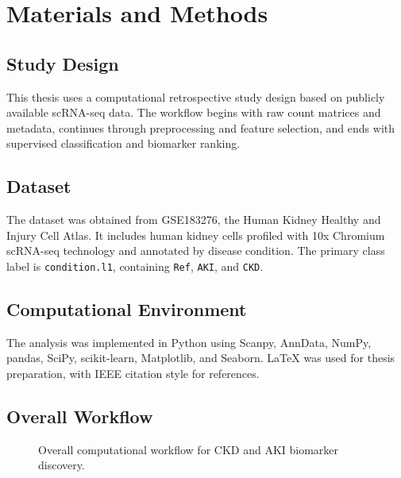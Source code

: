\chapter{Materials and Methods}
\section{Study Design}
This thesis uses a computational retrospective study design based on publicly available scRNA-seq data. The workflow begins with raw count matrices and metadata, continues through preprocessing and feature selection, and ends with supervised classification and biomarker ranking.

\section{Dataset}
The dataset was obtained from GSE183276, the Human Kidney Healthy and Injury Cell Atlas. It includes human kidney cells profiled with 10x Chromium scRNA-seq technology and annotated by disease condition. The primary class label is \texttt{condition.l1}, containing \texttt{Ref}, \texttt{AKI}, and \texttt{CKD}.


\section{Computational Environment}
The analysis was implemented in Python using Scanpy, AnnData, NumPy, pandas, SciPy, scikit-learn, Matplotlib, and Seaborn. LaTeX was used for thesis preparation, with IEEE citation style for references.

\section{Overall Workflow}
\begin{figure}[H]
\centering
{}
\caption{Overall computational workflow for CKD and AKI biomarker discovery.}
\label{fig:overall_workflow}
\end{figure}
